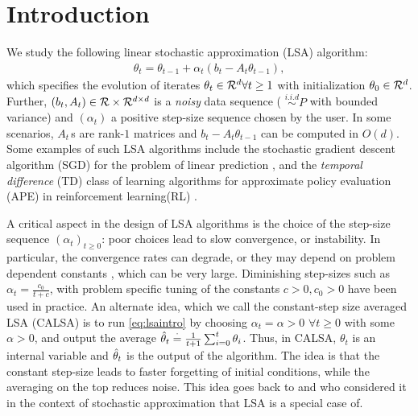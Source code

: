 \section{Introduction}\label{sec:intro}
We study the following linear stochastic approximation (LSA) algorithm: 
\begin{align}\label{eq:lsaintro}
\theta_t=\theta_{t-1}+\alpha_t (b_t-A_t \theta_{t-1}),
\end{align}
which specifies the evolution of iterates $\theta_t\in\mathcal{R}^d\forall t\geq 1$ with initialization $\theta_0\in\mathcal{R}^d$. Further, $(b_t,A_t)\in\mathcal{R}\times \mathcal{R}^{d \times d}$ is a \emph{noisy} data sequence ( $\overset{i.i.d}{\sim} P$ with bounded variance) and $(\alpha_t)$ a positive step-size sequence chosen by the user. In some scenarios, $A_t\,$s are rank-$1$ matrices and $b_t -A_t\theta_{t-1}$ can be computed in $O(d)$. Some examples of such LSA algorithms include the stochastic gradient descent algorithm (SGD) for the problem of linear prediction \cite{bach,bachaistats}, and the \emph{temporal difference} (TD) class of learning algorithms for approximate policy evaluation (APE) in reinforcement learning(RL) \cite{sutton,konda-tsitsiklis,KoTsi03:LSA,gtd,gtd2,gtdmp}.

A critical aspect in the design of LSA algorithms is the choice of the step-size sequence $(\alpha_t)_{t\geq 0}$: poor choices lead to slow convergence, or instability. In particular, the convergence rates can degrade, or they may depend on problem dependent constants \cite{bach-moulines}, which can be very large. Diminishing step-sizes such as $\alpha_t=\frac{c_0}{t+c}$, with problem specific tuning of the constants $c>0,c_0>0$ have been used in practice\cite{gtd2,gtdmp,konda-tsitsiklis}. An alternate idea, which we call the constant-step size averaged LSA (CALSA) is to run \eqref{eq:lsaintro} by choosing $\alpha_t=\alpha>0$ $\forall t\geq 0$ with some $\alpha>0$, and output the average $\hat{\theta}_t\stackrel{\cdot}{=}\frac{1}{t+1}\sum_{i=0}^t \theta_i$. Thus, in CALSA, $\theta_t$ is an internal variable and $\hat{\theta}_t$ is the output of the algorithm. The idea is that the constant step-size leads to faster forgetting of initial conditions, while the averaging on the top reduces noise. This idea goes back to  \citet{ruppert} and \citet{polyak-judisky} who considered it in the context of stochastic approximation that LSA is a special case of. 

